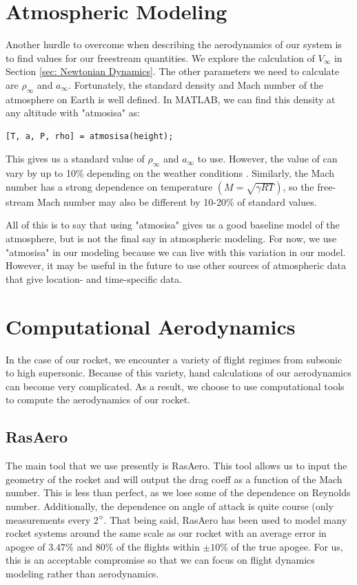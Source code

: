 \documentclass[12pt]{report}
\begin{document}
\section{Atmospheric Modeling}
Another hurdle to overcome when describing the aerodynamics of our system is to find values for our \gls{freestream} quantities. We explore the calculation of $V_{\infty}$ in Section \ref{sec: Newtonian Dynamics}. The other parameters we need to calculate are $\rho_{\infty}$ and $a_{\infty}$. Fortunately, the standard density and Mach number of the atmosphere on Earth is well defined. In MATLAB, we can find this density at any altitude with "atmosisa" as:
\begin{lstlisting}[style=Matlab-editor]
    [T, a, P, rho] = atmosisa(height);
\end{lstlisting}
This gives us a standard value of $\rho_{\infty}$ and $a_{\infty}$ to use. However, the value of can vary by up to 10\% depending on the weather conditions \cite{svickova_air_2020}. Similarly, the Mach number has a strong dependence on temperature $\left(M=\sqrt{\gamma RT}\right)$, so the free-stream Mach number may also be different by 10-20\% of standard values. 

All of this is to say that using "atmosisa" gives us a good baseline model of the atmosphere, but is not the final say in atmospheric modeling. For now, we use "atmosisa" in our modeling because we can live with this variation in our model. However, it may be useful in the future to use other sources of atmospheric data that give location- and time-specific data.
\section{Computational Aerodynamics}
In the case of our rocket, we encounter a variety of flight regimes from subsonic to high supersonic. Because of this variety, hand calculations of our aerodynamics can become very complicated. As a result, we choose to use computational tools to compute the aerodynamics of our rocket.
\subsection{RasAero}
The main tool that we use presently is RasAero. This tool allows us to input the geometry of the rocket and will output the \gls{drag coeff} as a function of the Mach number. This is less than perfect, as we lose some of the dependence on Reynolds number. Additionally, the dependence on \gls{angle of attack} is quite course (only measurements every 2$\degree$. That being said, RasAero has been used to model many rocket systems around the same scale as our rocket with an average error in apogee of $3.47\%$ and $80\%$ of the flights within $\pm10\%$ of the true apogee. For us, this is an acceptable compromise so that we can focus on flight dynamics modeling rather than aerodynamics.
\end{document}
